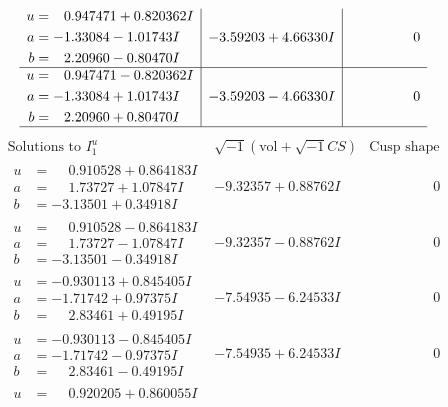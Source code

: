 \documentclass[1p]{elsarticle_modified}
\theoremstyle{definition}
\newcommand{\I}{\sqrt{-1}}
\begin{document}
$$\begin{array}{c|c|c}
\begin{aligned}
u &= \phantom{-}0.947471 + 0.820362 I \\
a &= -1.33084 - 1.01743 I \\
b &= \phantom{-}2.20960 - 0.80470 I\end{aligned}
 & -3.59203 + 4.66330 I & \phantom{-0.000000 } 0 \\ \hline\begin{aligned}
u &= \phantom{-}0.947471 - 0.820362 I \\
a &= -1.33084 + 1.01743 I \\
b &= \phantom{-}2.20960 + 0.80470 I\end{aligned}
 & -3.59203 - 4.66330 I & \phantom{-0.000000 } 0\\
 \hline 
 \end{array}$$\newpage$$\begin{array}{c|c|c}  
\text{Solutions to }I^u_{1}& \I (\text{vol} + \sqrt{-1}CS) & \text{Cusp shape}\\
 \hline 
\begin{aligned}
u &= \phantom{-}0.910528 + 0.864183 I \\
a &= \phantom{-}1.73727 + 1.07847 I \\
b &= -3.13501 + 0.34918 I\end{aligned}
 & -9.32357 + 0.88762 I & \phantom{-0.000000 } 0 \\ \hline\begin{aligned}
u &= \phantom{-}0.910528 - 0.864183 I \\
a &= \phantom{-}1.73727 - 1.07847 I \\
b &= -3.13501 - 0.34918 I\end{aligned}
 & -9.32357 - 0.88762 I & \phantom{-0.000000 } 0 \\ \hline\begin{aligned}
u &= -0.930113 + 0.845405 I \\
a &= -1.71742 + 0.97375 I \\
b &= \phantom{-}2.83461 + 0.49195 I\end{aligned}
 & -7.54935 - 6.24533 I & \phantom{-0.000000 } 0 \\ \hline\begin{aligned}
u &= -0.930113 - 0.845405 I \\
a &= -1.71742 - 0.97375 I \\
b &= \phantom{-}2.83461 - 0.49195 I\end{aligned}
 & -7.54935 + 6.24533 I & \phantom{-0.000000 } 0 \\ \hline\begin{aligned}
u &= \phantom{-}0.920205 + 0.860055 I \\

\end{aligned}
\end{array}$$
\end{document}
